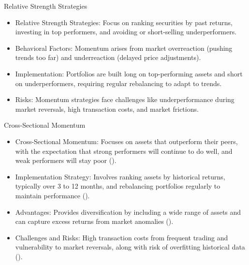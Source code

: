 \documentclass{beamer}
\begin{document}
\begin{frame}{Relative Strength Strategies}
\begin{itemize}
        \item Relative Strength Strategies: Focus on ranking securities by past returns, investing in top performers, and avoiding or short-selling underperformers.
        \item Behavioral Factors: Momentum arises from market overreaction (pushing trends too far) and underreaction (delayed price adjustments).
        \item Implementation: Portfolios are built long on top-performing assets and short on underperformers, requiring regular rebalancing to adapt to trends.
        \item Risks: Momentum strategies face challenges like underperformance during market reversals, high transaction costs, and market frictions.
    \end{itemize}
\end{frame}

\begin{frame}{Cross-Sectional Momentum}
\begin{itemize}
        \item Cross-Sectional Momentum: Focuses on assets that outperform their peers, with the expectation that strong performers will continue to do well, and weak performers will stay poor (\textcite{jegadeesh1993returns}).
        \item Implementation Strategy: Involves ranking assets by historical returns, typically over 3 to 12 months, and rebalancing portfolios regularly to maintain performance (\textcite{fama1996multifactor}).
        \item Advantages: Provides diversification by including a wide range of assets and can capture excess returns from market anomalies (\textcite{moskowitz2012time}).
        \item Challenges and Risks: High transaction costs from frequent trading and vulnerability to market reversals, along with risk of overfitting historical data (\textcite{barroso2015momentum}).
    \end{itemize}
\end{frame}
\end{document}
